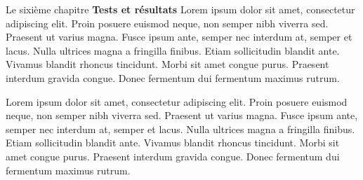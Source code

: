 Le sixième chapitre \og \textbf{Tests et résultats} \fg Lorem ipsum dolor sit amet, consectetur adipiscing elit. Proin posuere euismod neque, non semper nibh viverra sed. Praesent ut varius magna. Fusce ipsum ante, semper nec interdum at, semper et lacus. Nulla ultrices magna a fringilla finibus. Etiam sollicitudin blandit ante. Vivamus blandit rhoncus tincidunt. Morbi sit amet congue purus. Praesent interdum gravida congue. Donec fermentum dui fermentum maximus rutrum.

\medskip

Lorem ipsum dolor sit amet, consectetur adipiscing elit. Proin posuere euismod neque, non semper nibh viverra sed. Praesent ut varius magna. Fusce ipsum ante, semper nec interdum at, semper et lacus. Nulla ultrices magna a fringilla finibus. Etiam sollicitudin blandit ante. Vivamus blandit rhoncus tincidunt. Morbi sit amet congue purus. Praesent interdum gravida congue. Donec fermentum dui fermentum maximus rutrum.


